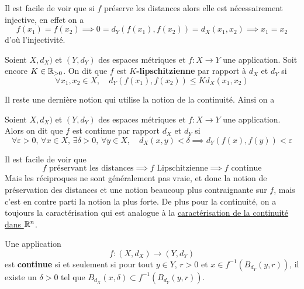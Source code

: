 \begin{remarque}
	Il est facile de voir que si $f$ préserve les distances alors elle est nécessairement injective, en effet on a
	\[
	f(x_1) = f(x_2) \implies 0 = d_Y(f(x_1), f(x_2)) = d_X(x_1, x_2) \implies x_1 = x_2
	\]
	d'où l'injectivité.
\end{remarque}

\begin{definition}
	Soient $X, d_X)$ et $(Y, d_Y)$ des espaces métriques et $f : X \to Y$ une application. Soit encore $K \in \mathbb{R}_{> 0}$. On dit que $f$ est $K$\textbf{-lipschitzienne} par rapport à $d_X$ et $d_Y$ si
	\[
	\forall x_1, x_2 \in X, \quad d_Y(f(x_1), f(x_2)) \leqslant K d_X(x_1, x_2)
	\]

\end{definition}
Il reste une dernière notion qui utilise la notion de la continuité. Ainsi on a
\begin{definition}
	Soient $X, d_X)$ et $(Y, d_Y)$ des espaces métriques et $f : X \to Y$ une application. Alors on dit que $f$ est continue par rapport $d_X$ et $d_Y$ si 
	\[
	\forall \varepsilon > 0, \, \forall x \in X, \, \exists \delta >  0, \, \forall y \in X, \quad d_X(x,y) < \delta \implies d_Y(f(x), f(y)) < \varepsilon
	\]
\end{definition}	

\begin{remarque}
	Il est facile de voir que 
	\[
	\text{$f$ préservant les distances} \implies \text{$f$ Lipschitzienne} \implies \text{$f$ continue}
	\]
	Mais les réciproques ne sont généralement pas vraie, et donc la notion de préservation des distances et une notion beaucoup plus contraignante sur $f$, mais c'est en contre parti la notion la plus forte. De plus pour la continuité, on a toujours la caractérisation qui est analogue à la \hyperref[thm: Caractérisation de la continuité]{caractérisation de la continuité dans $\mathbb{R}^n$}.
\end{remarque}

\begin{theoreme}
	Une application
	\[
	f : (X, d_X) \longrightarrow (Y, d_Y)
	\]
	est \textbf{continue} si et seulement si pour tout $y \in Y$, $r > 0$ et $x \in f^{-1}(B_{d_Y}(y,r))$, il existe un $\delta > 0$ tel que $B_{d_X} (x, \delta) \subset f^{-1} (B_{d_Y}(y,r))$.
\end{theoreme}

